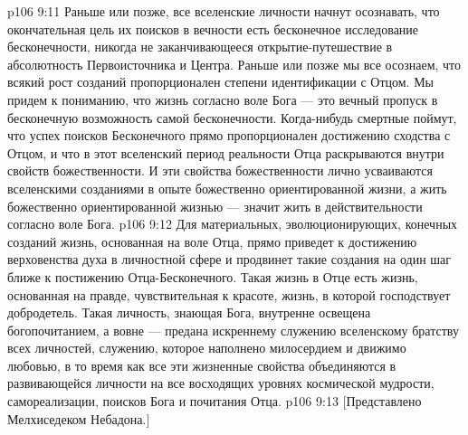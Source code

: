 \vs p106 9:11 \pc Раньше или позже, все вселенские личности начнут осознавать, что окончательная цель их поисков в вечности есть бесконечное исследование бесконечности, никогда не заканчивающееся открытие\hyp{}путешествие в абсолютность Первоисточника и Центра. Раньше или позже мы все осознаем, что всякий рост созданий пропорционален степени идентификации с Отцом. Мы придем к пониманию, что жизнь согласно воле Бога --- это вечный пропуск в бесконечную возможность самой бесконечности. Когда\hyp{}нибудь смертные поймут, что успех поисков Бесконечного прямо пропорционален достижению сходства с Отцом, и что в этот вселенский период реальности Отца раскрываются внутри свойств божественности. И эти свойства божественности лично усваиваются вселенскими созданиями в опыте божественно ориентированной жизни, а жить божественно ориентированной жизнью --- значит жить в действительности согласно воле Бога.
\vs p106 9:12 Для материальных, эволюционирующих, конечных созданий жизнь, основанная на воле Отца, прямо приведет к достижению верховенства духа в личностной сфере и продвинет такие создания на один шаг ближе к постижению Отца\hyp{}Бесконечного. Такая жизнь в Отце есть жизнь, основанная на правде, чувствительная к красоте, жизнь, в которой господствует добродетель. Такая личность, знающая Бога, внутренне освещена богопочитанием, а вовне --- предана искреннему служению вселенскому братству всех личностей, служению, которое наполнено милосердием и движимо любовью, в то время как все эти жизненные свойства объединяются в развивающейся личности на все восходящих уровнях космической мудрости, самореализации, поисков Бога и почитания Отца.
\vsetoff
\vs p106 9:13 [Представлено Мелхиседеком Небадона.]
